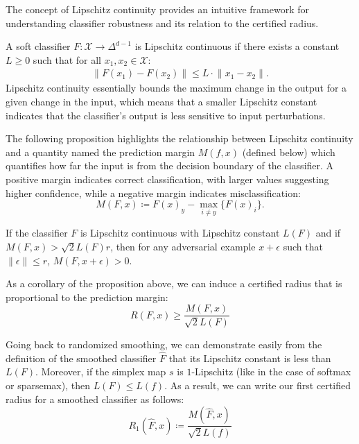 The concept of Lipschitz continuity provides an intuitive framework for understanding classifier robustness and its relation to the certified radius.

A soft classifier $F: \mathcal{X} \rightarrow \Delta^{d-1}$ is Lipschitz continuous if there exists a constant $L \geq 0$ such that for all $x_1, x_2 \in \mathcal{X}$:
\begin{align*}
    \lVert F(x_1)- F(x_2) \rVert \leq L \cdot \lVert  x_1- x_2\rVert.
\end{align*}
Lipschitz continuity essentially bounds the maximum change in the output for a given change in the input, which means that a smaller Lipschitz constant indicates that the classifier's output is less sensitive to input perturbations.

The following proposition highlights the relationship between Lipschitz continuity and a quantity named the prediction margin $M(f,x)$ (defined below) which quantifies how far the input is from the decision boundary of the classifier.
A positive margin indicates correct classification, with larger values suggesting higher confidence, while a negative margin indicates misclassification:
\begin{equation}
    M(F,x) \coloneqq F(x)_{y} - \max_{i \neq y}\{F(x)_i\}.\label{eq:prediction-margin}
\end{equation}
\begin{proposition}
    If the classifier $F$ is Lipschitz continuous with Lipschitz constant $L(F)$ and if $M(F,x)>\sqrt{2}L(F)r$, then for any adversarial example $x+\epsilon$ such that $\lVert \epsilon \rVert\leq r$, $M(F,x+\epsilon)>0$.
\end{proposition}

As a corollary of the proposition above, we can induce a certified radius that is proportional to the prediction margin:
\[
    R(F,x) \geq \frac{M(F,x)}{\sqrt{2}L(F)}
\]

Going back to randomized smoothing, we can demonstrate easily from the definition of the smoothed classifier $\hat{F}$ that its Lipschitz constant is less than $L(F)$.
Moreover, if the simplex map $s$ is $1$-Lipschitz (like in the case of softmax or sparsemax), then $L(F)\leq L(f)$.
As a result, we can write our first certified radius for a smoothed classifier as follows:
\begin{equation}
    R_1(\hat{F},x) \coloneqq \frac{M(\hat{F},x)}{\sqrt{2}L(f)}\label{eq:first-radius}
\end{equation}

